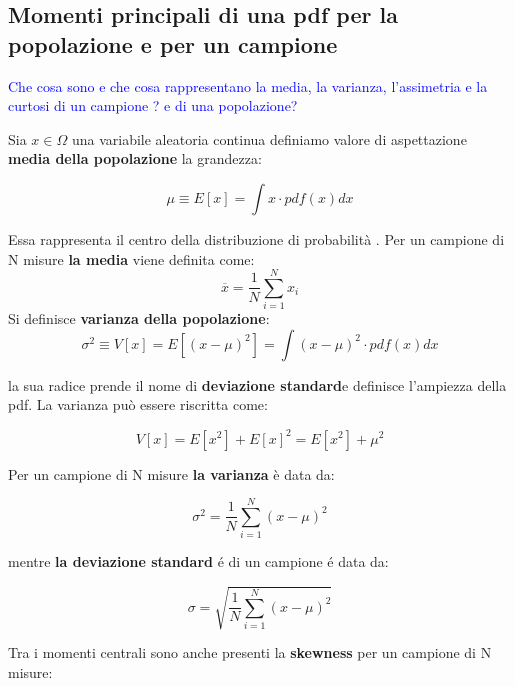 \documentclass[11pt,a4paper]{book}
\begin{document}
\subsection{Momenti principali di una pdf per la popolazione e per un campione}

\textcolor{blue}{Che cosa sono e che cosa rappresentano la media, la varianza, l'assimetria e la curtosi di un campione ? e di una popolazione?} \newline

Sia $x \in \Omega $ una variabile aleatoria continua definiamo valore di aspettazione \textbf{media della popolazione} la grandezza:

\begin{equation}
	\mu \equiv E[x] = \int{x \cdot pdf(x)dx}
\end{equation}


\noindent Essa rappresenta il centro della distribuzione di probabilit\`{a} .\newline 
Per un campione di N  misure \textbf{la media} viene definita come: 
\begin{equation}
	\overline{x} = \dfrac{1}{N}\sum_{i=1}^Nx_{i}
\end{equation}
Si definisce \textbf{varianza della popolazione}:
\begin{equation}
	\sigma^2 \equiv V[x] = E[(x-\mu)^2] = \int{(x-\mu)^2 \cdot pdf(x)dx} 	
\end{equation}

la sua radice prende il nome di \textbf{deviazione standard}e definisce l'ampiezza della pdf. La varianza pu\`{o} essere riscritta come:

\begin{equation}
	V[x] = E[x^2] + E[x]^2 = E[x^2] + \mu^2
\end{equation}

Per un campione di N misure \textbf{la varianza} \`{e} data da:

\begin{equation}
	\sigma^2 = \dfrac{1}{N}\sum_{i=1}^N(x- \mu)^2
\end{equation}

mentre \textbf{la deviazione standard} \'{e} di un campione \'{e} data da:

\begin{equation}
	\sigma = \sqrt{\dfrac{1}{N}\sum_{i=1}^N(x- \mu)^2}
\end{equation}

Tra i momenti centrali sono anche presenti la \textbf{skewness} per un campione di N misure:
\end{document}
